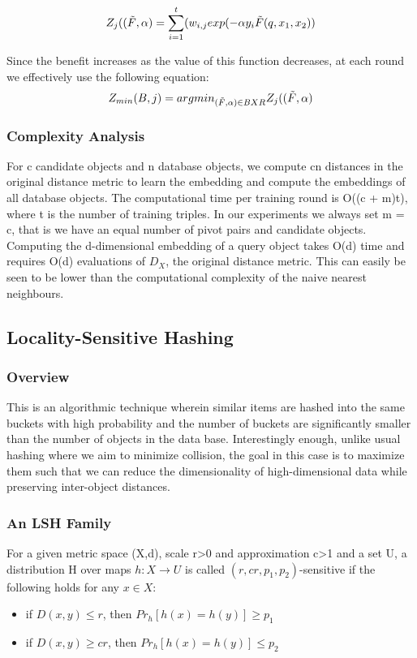 \begin{equation}
    Z_j((\Tilde{F},\alpha) = \sum_{i=1}^t(w_{i,j}exp(-\alpha y_i \Tilde{F}(q,x_1,x_2))
\end{equation}

Since the benefit increases as the value of this function decreases, at each round we effectively use the following equation:
\begin{equation}
    Z_{min}(B,j) = argmin_{(\Tilde{F},\alpha) \in B X R} Z_j((\Tilde{F},\alpha)
\end{equation}

\subsubsection{Complexity Analysis}
For c candidate objects and n database objects, we compute
cn distances in the original distance metric to learn the embedding and compute the embeddings of all database objects. 
The computational time per training round is O((c + m)t), where t is the number of training triples. In our experiments we always set m = c, that is we have an equal number of pivot pairs and candidate objects.
Computing the d-dimensional embedding of a query object takes O(d) time and requires O(d) evaluations of $D_X$, the original distance metric. 
This can easily be seen to be lower than the computational complexity of the naive nearest neighbours. 

\subsection{Locality-Sensitive Hashing}

\subsubsection{Overview}
This is an algorithmic technique wherein similar items are hashed into the same buckets with high probability and the number of buckets are significantly smaller than the number of objects in the data base. Interestingly enough, unlike usual hashing where we aim to minimize collision, the goal in this case is to maximize them such that we can reduce the dimensionality of high-dimensional data while preserving inter-object distances.


\subsubsection{An LSH Family}
For a given metric space (X,d), scale r>0 and approximation c>1 and a set U, a distribution H over maps $h:X \rightarrow U$ is called $(r,cr,p_1,p_2)$-sensitive if the following holds for any $x \in X$:
\begin{itemize}
  \item if $D(x, y) \leq r$, then $Pr_h[h(x) = h(y)] \geq p_1$
  \item if $D(x, y) \geq cr$, then $Pr_h[h(x) = h(y)] \leq p_2$
\end{itemize}

